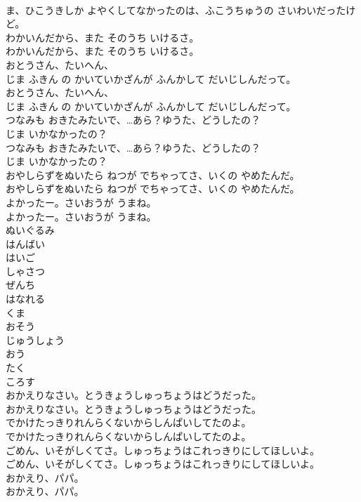 \documentclass[8pt]{extreport}
\begin{document}
\begin{CJK}{UTF8}{min}
\\	ま、ひこうきしか よやくしてなかったのは、ふこうちゅうの さいわいだったけど。 
\\	わかいんだから、また そのうち いけるさ。	
\\	わかいんだから、また そのうち いけるさ。 
\\	おとうさん、たいへん、
\\	じま ふきん の かいていかざんが ふんかして だいじしんだって。	
\\	おとうさん、たいへん、
\\	じま ふきん の かいていかざんが ふんかして だいじしんだって。 
\\	つなみも おきたみたいで、…あら？ゆうた、どうしたの？
\\	じま いかなかったの？	
\\	つなみも おきたみたいで、…あら？ゆうた、どうしたの？
\\	じま いかなかったの？ 
\\	おやしらずをぬいたら ねつが でちゃってさ、いくの やめたんだ。	
\\	おやしらずをぬいたら ねつが でちゃってさ、いくの やめたんだ。 
\\	よかったー。さいおうが うまね。	
\\	よかったー。さいおうが うまね。 
\\	ぬいぐるみ
\\	はんばい
\\	はいご
\\	しゃさつ
\\	ぜんち
\\	はなれる
\\	くま
\\	おそう
\\	じゅうしょう
\\	おう
\\	たく
\\	ころす
\\	おかえりなさい。とうきょうしゅっちょうはどうだった。	
\\	おかえりなさい。とうきょうしゅっちょうはどうだった。 
\\	でかけたっきりれんらくないからしんぱいしてたのよ。	
\\	でかけたっきりれんらくないからしんぱいしてたのよ。 
\\	ごめん、いそがしくてさ。しゅっちょうはこれっきりにしてほしいよ。	
\\	ごめん、いそがしくてさ。しゅっちょうはこれっきりにしてほしいよ。 
\\	おかえり、パパ。	
\\	おかえり、パパ。 

\end{CJK}
\end{document}
